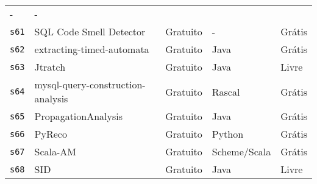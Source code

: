 \begin{longtable}{l l l p{3cm} l}
      - &
      - \\
    \texttt{s61} &
      SQL Code Smell Detector &
      Gratuito &
      - &
      Grátis \\
    \texttt{s62} &
      extracting-timed-automata &
      Gratuito &
      Java &
      Grátis \\
    \texttt{s63} &
      Jtratch &
      Gratuito &
      Java &
      Livre \\
    \texttt{s64} &
      mysql-query-construction-analysis &
      Gratuito &
      Rascal &
      Grátis \\
    \texttt{s65} &
      PropagationAnalysis &
      Gratuito &
      Java &
      Grátis \\
    \texttt{s66} &
      PyReco &
      Gratuito &
      Python &
      Grátis \\
    \texttt{s67} &
      Scala-AM &
      Gratuito &
      Scheme/Scala &
      Grátis \\
    \texttt{s68} &
      SID &
      Gratuito &
      Java &
      Livre \\
  \hline
\end{longtable}
